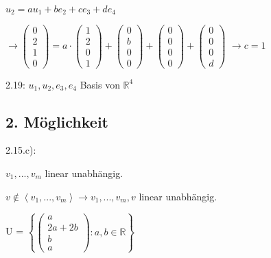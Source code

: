 \documentclass[a4paper, openany]{book}
\begin{document}
\begin{enumerate}[label=(\alph*)]
      \par \medskip

      $u_2 = au_1+be_2+ce_3+de_4$

      $\rightarrow \begin{pmatrix}0 \\ 2 \\1 \\ 0 \end{pmatrix} = a \cdot \begin{pmatrix}1 \\ 2 \\ 0 \\ 1 \end{pmatrix} + \begin{pmatrix} 0 \\ b \\ 0 \\ 0 \end{pmatrix} + \begin{pmatrix}0 \\ 0 \\ 0 \\ 0 \end{pmatrix} + \begin{pmatrix}0 \\ 0 \\ 0 \\ d \end{pmatrix}$ $\rightarrow c = 1$

      \par \medskip

      2.19: $u_1,u_2,e_3, e_4$ Basis von $\mathbb{R}^4$
    \end{enumerate}

    \subsection{2. Möglichkeit}

    2.15.c): 

    $v_1, ..., v_m$ linear unabhängig.

    $v \not \in \left \langle v_1, ..., v_m \right \rangle \rightarrow v_1, ..., v_m, v $ linear unabhängig.

    \par \medskip

    U = $\left \lbrace \begin{pmatrix}a \\ 2a + 2b \\ b \\ a\end{pmatrix} : a,b \in \mathbb{R} \right \rbrace$
\end{document}
